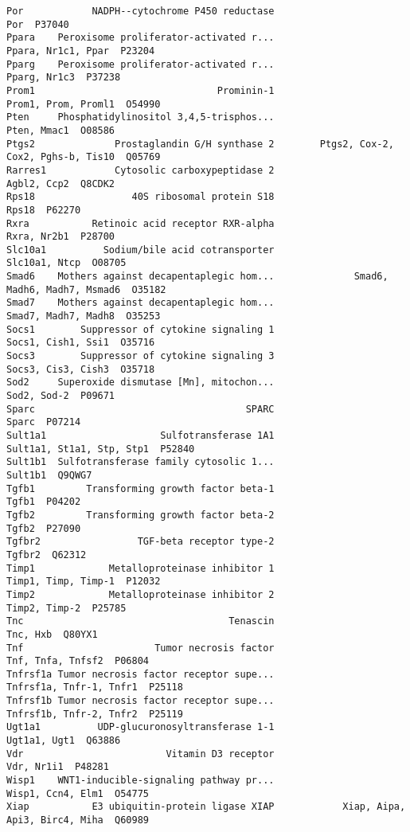\documentclass[]{article}
\begin{document}
\begin{verbatim}
Por            NADPH--cytochrome P450 reductase                                      Por  P37040
Ppara    Peroxisome proliferator-activated r...                       Ppara, Nr1c1, Ppar  P23204
Pparg    Peroxisome proliferator-activated r...                             Pparg, Nr1c3  P37238
Prom1                                Prominin-1                      Prom1, Prom, Proml1  O54990
Pten     Phosphatidylinositol 3,4,5-trisphos...                              Pten, Mmac1  O08586
Ptgs2              Prostaglandin G/H synthase 2        Ptgs2, Cox-2, Cox2, Pghs-b, Tis10  Q05769
Rarres1            Cytosolic carboxypeptidase 2                              Agbl2, Ccp2  Q8CDK2
Rps18                 40S ribosomal protein S18                                    Rps18  P62270
Rxra           Retinoic acid receptor RXR-alpha                              Rxra, Nr2b1  P28700
Slc10a1          Sodium/bile acid cotransporter                            Slc10a1, Ntcp  O08705
Smad6    Mothers against decapentaplegic hom...              Smad6, Madh6, Madh7, Msmad6  O35182
Smad7    Mothers against decapentaplegic hom...                      Smad7, Madh7, Madh8  O35253
Socs1        Suppressor of cytokine signaling 1                       Socs1, Cish1, Ssi1  O35716
Socs3        Suppressor of cytokine signaling 3                       Socs3, Cis3, Cish3  O35718
Sod2     Superoxide dismutase [Mn], mitochon...                              Sod2, Sod-2  P09671
Sparc                                     SPARC                                    Sparc  P07214
Sult1a1                    Sulfotransferase 1A1                Sult1a1, St1a1, Stp, Stp1  P52840
Sult1b1  Sulfotransferase family cytosolic 1...                                  Sult1b1  Q9QWG7
Tgfb1         Transforming growth factor beta-1                                    Tgfb1  P04202
Tgfb2         Transforming growth factor beta-2                                    Tgfb2  P27090
Tgfbr2                 TGF-beta receptor type-2                                   Tgfbr2  Q62312
Timp1             Metalloproteinase inhibitor 1                      Timp1, Timp, Timp-1  P12032
Timp2             Metalloproteinase inhibitor 2                            Timp2, Timp-2  P25785
Tnc                                    Tenascin                                 Tnc, Hxb  Q80YX1
Tnf                       Tumor necrosis factor                        Tnf, Tnfa, Tnfsf2  P06804
Tnfrsf1a Tumor necrosis factor receptor supe...                  Tnfrsf1a, Tnfr-1, Tnfr1  P25118
Tnfrsf1b Tumor necrosis factor receptor supe...                  Tnfrsf1b, Tnfr-2, Tnfr2  P25119
Ugt1a1          UDP-glucuronosyltransferase 1-1                             Ugt1a1, Ugt1  Q63886
Vdr                         Vitamin D3 receptor                               Vdr, Nr1i1  P48281
Wisp1    WNT1-inducible-signaling pathway pr...                        Wisp1, Ccn4, Elm1  O54775
Xiap           E3 ubiquitin-protein ligase XIAP            Xiap, Aipa, Api3, Birc4, Miha  Q60989
\end{verbatim}
\end{document}
